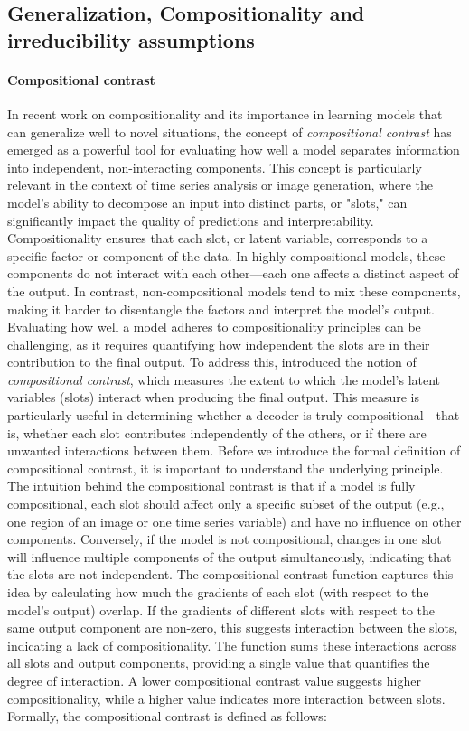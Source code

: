 \documentclass{article} %
\theoremstyle{plain}
\theoremstyle{definition}
\theoremstyle{remark}
\numberwithin{equation}{section}
\begin{document}
\subsection{Generalization, Compositionality and irreducibility assumptions~}\label{app:app_comp_irr}

\paragraph{Compositional contrast}\label{app:comp_contrast}
In recent work on compositionality \citep{assouel2022objectcentric, zhao2022toward, KurthNelson2022ReplayAC} and its importance in learning models that can generalize well to novel situations, the concept of \emph{compositional contrast} has emerged as a powerful tool for evaluating how well a model separates information into independent, non-interacting components. This concept is particularly relevant in the context of time series analysis or image generation, where the model’s ability to decompose an input into distinct parts, or "slots," can significantly impact the quality of predictions and interpretability. Compositionality ensures that each slot, or latent variable, corresponds to a specific factor or component of the data. In highly compositional models, these components do not interact with each other—each one affects a distinct aspect of the output. In contrast, non-compositional models tend to mix these components, making it harder to disentangle the factors and interpret the model’s output. Evaluating how well a model adheres to compositionality principles can be challenging, as it requires quantifying how independent the slots are in their contribution to the final output. To address this, \citet{brady2023provably} introduced the notion of \emph{compositional contrast}, which measures the extent to which the model’s latent variables (slots) interact when producing the final output. This measure is particularly useful in determining whether a decoder is truly compositional—that is, whether each slot contributes independently of the others, or if there are unwanted interactions between them. Before we introduce the formal definition of compositional contrast, it is important to understand the underlying principle. The intuition behind the compositional contrast is that if a model is fully compositional, each slot should affect only a specific subset of the output (e.g., one region of an image or one time series variable) and have no influence on other components. Conversely, if the model is not compositional, changes in one slot will influence multiple components of the output simultaneously, indicating that the slots are not independent. The compositional contrast function captures this idea by calculating how much the gradients of each slot (with respect to the model’s output) overlap. If the gradients of different slots with respect to the same output component are non-zero, this suggests interaction between the slots, indicating a lack of compositionality. The function sums these interactions across all slots and output components, providing a single value that quantifies the degree of interaction. A lower compositional contrast value suggests higher compositionality, while a higher value indicates more interaction between slots. Formally, the compositional contrast is defined as follows:
\end{document}
